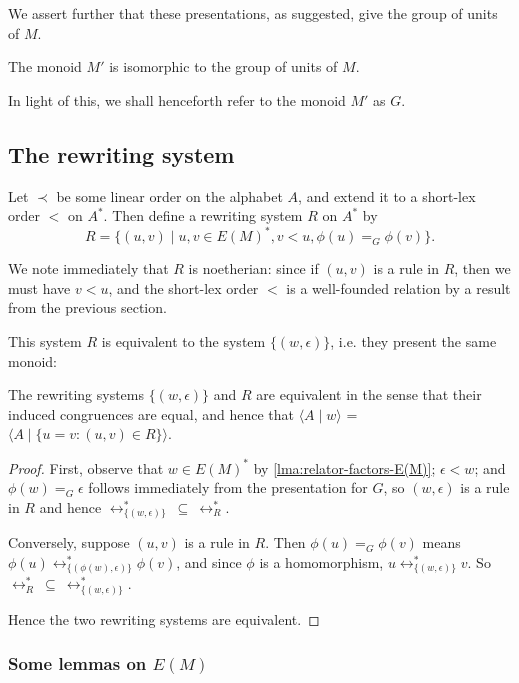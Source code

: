 \documentclass[showlabels,noindex,12pt]{lmaths}
\begin{document}
We assert further that these presentations, as suggested, give the group of units of $M$.

\begin{theorem}
	The monoid $M'$ is isomorphic to the group of units of $M$.
\end{theorem}

In light of this, we shall henceforth refer to the monoid $M'$ as $G$.

\subsection{The rewriting system}

Let $\prec$ be some linear order on the alphabet $A$, and extend it to a short-lex order $<$ on $A^*$. Then define a rewriting system $R$ on $A^*$ by
	\[ R = \{ (u, v) \mid u, v \in E(M)^*, v < u, \phi(u) =_G \phi(v) \}. \]

We note immediately that $R$ is noetherian: since if $(u, v)$ is a rule in $R$, then we must have $v < u$, and the short-lex order $<$ is a well-founded relation by a result from the previous section.

This system $R$ is equivalent to the system $\{(w, \epsilon)\}$, i.e. they present the same monoid:
\begin{lemma} \label{lma:R-equivalent-to-pres}
	The rewriting systems $\{(w, \epsilon)\}$ and $R$ are equivalent in the sense that their induced congruences  are equal, and hence that $\langle A \mid w \rangle$ = $\langle A \mid \{u = v : (u, v) \in R\}\rangle$.
\end{lemma}
\begin{proof}
	First, observe that $w \in E(M)^*$ by \cref{lma:relator-factors-E(M)}; $\epsilon < w$; and $\phi(w) =_G \epsilon$ follows immediately from the presentation for $G$, so $(w, \epsilon)$ is a rule in $R$ and hence $\leftrightarrow^*_{\{(w,\epsilon)\}}\ \subseteq\ \leftrightarrow^*_R$.

Conversely, suppose $(u, v)$ is a rule in $R$. Then $\phi(u) =_G \phi(v)$ means $\phi(u) \leftrightarrow^*_{\{(\phi(w), \epsilon)\}} \phi(v)$, and since $\phi$ is a homomorphism, $u \leftrightarrow^*_{\{(w, \epsilon)\}} v$. So $\leftrightarrow^*_R\ \subseteq\ \leftrightarrow^*_{\{(w,\epsilon)\}}$.

Hence the two rewriting systems are equivalent.
\end{proof}


\subsubsection{\texorpdfstring{Some lemmas on $E(M)$}{Some lemmas on E(M)}}
\end{document}
